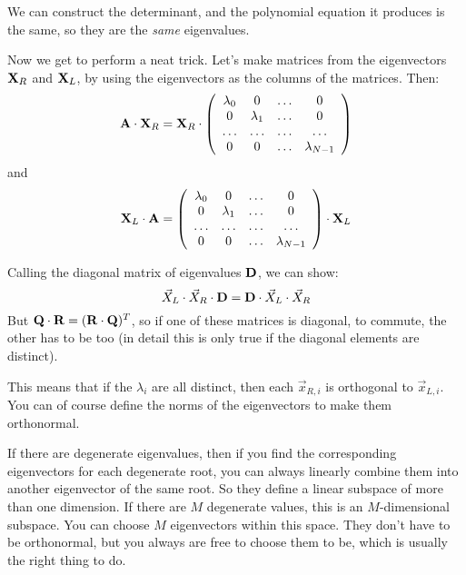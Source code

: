 
\begin{answer}
We can construct the determinant, and the polynomial equation it
produces is the same, so they are the {\it same} eigenvalues.
\end{answer}

Now we get to perform a neat trick. Let's make matrices from the
eigenvectors ${\bf X}_R$ and ${\bf X}_L$, by using the eigenvectors as
the columns of the matrices.  Then:
\begin{equation}
  {\bf A}\cdot{\bf X}_R = {\bf X}_R \cdot
  \left(
  \begin{array}{cccc}
    \lambda_0 & 0 & \ldots & 0 \cr
    0 & \lambda_1 & \ldots & 0 \cr
    \ldots & \ldots & \ldots & \ldots \cr
    0 & 0 & \ldots & \lambda_{N-1} \cr
  \end{array}
  \right)
\end{equation}
and
\begin{equation}
  {\bf X}_L \cdot {\bf A} = 
  \left(
  \begin{array}{cccc}
    \lambda_0 & 0 & \ldots & 0 \cr
    0 & \lambda_1 & \ldots & 0 \cr
    \ldots & \ldots & \ldots & \ldots \cr
    0 & 0 & \ldots & \lambda_{N-1} \cr
  \end{array}
  \right) \cdot {\bf X}_L
\end{equation}

Calling the diagonal matrix of eigenvalues ${\bf D}$, we can show:
\begin{equation}
\vec{X}_L \cdot \vec{X}_R \cdot {\bf D} 
= {\bf D} \cdot \vec{X}_L \cdot \vec{X}_R
\end{equation}
But ${\bf Q}\cdot{\bf R} = ({\bf R}\cdot{\bf Q})^T$, so if one of
these matrices is diagonal, to commute, the other has to be too (in
detail this is only true if the diagonal elements are distinct). 

This means that if the $\lambda_i$ are all distinct, then each
$\vec{x}_{R,i}$ is orthogonal to $\vec{x}_{L,i}$. You can of course
define the norms of the eigenvectors to make them orthonormal. 

If there are degenerate eigenvalues, then if you find the
corresponding eigenvectors for each degenerate root, you can always
linearly combine them into another eigenvector of the same root. So
they define a linear subspace of more than one dimension. If there are
$M$ degenerate values, this is an $M$-dimensional subspace. You can
choose $M$ eigenvectors within this space. They don't have to be
orthonormal, but you always are free to choose them to be, which is
usually the right thing to do.

